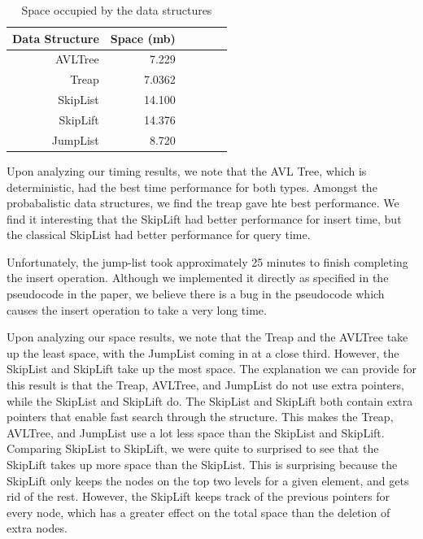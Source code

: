 \documentclass[oribibl]{llncs}
\begin{document}
\begin{table}[htbp]
\caption{Space occupied by the data structures}
\begin{center}
\begin{tabular}{|r|r|r|r|r|r|}
\hline
Data Structure & Space (mb) \\ \hline
AVLTree & 7.229 \\ \hline
Treap & 7.0362 \\ \hline
SkipList & 14.100   \\ \hline
SkipLift & 14.376  \\ \hline
JumpList & 8.720 \\ \hline
\end{tabular}
\end{center}
\label{abc}
\end{table}

Upon analyzing our timing results, we note that the AVL Tree, which is deterministic, had the best time performance for both types. Amongst the probabalistic data structures, we find the treap gave hte best performance. We find it interesting that the SkipLift had better performance for insert time, but the classical SkipList had better performance for query time.

Unfortunately, the jump-list took approximately 25 minutes to finish completing the insert operation. Although we implemented it directly as specified in the pseudocode in the paper, we believe there is a bug in the pseudocode which causes the insert operation to take a very long time.

Upon analyzing our space results, we note that the Treap and the AVLTree take up the least space, with the JumpList coming in at a close third. However, the SkipList and SkipLift take up the most space. The explanation we can provide for this result is that the Treap, AVLTree, and JumpList do not use extra pointers, while the SkipList and SkipLift do. The SkipList and SkipLift both contain extra pointers that enable fast search through the structure. This makes the Treap, AVLTree, and JumpList use a lot less space than the SkipList and SkipLift. Comparing SkipList to SkipLift, we were quite to surprised to see that the SkipLift takes up more space than the SkipList. This is surprising because the SkipLift only keeps the nodes on the top two levels for a given element, and gets rid of the rest. However, the SkipLift keeps track of the previous pointers for every node, which has a greater effect on the total space than the deletion of extra nodes.
\end{document}
